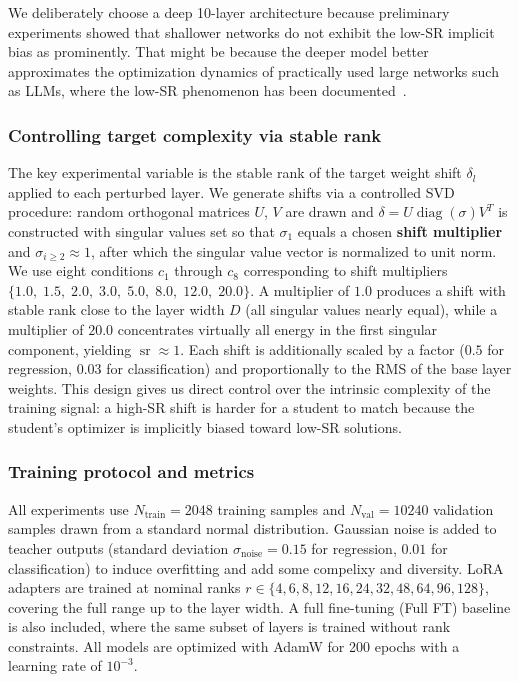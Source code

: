 \documentclass[a4paper,14pt]{extarticle}
\DeclareMathOperator{\sr}{sr}
\begin{document}
    We deliberately choose a deep 10-layer architecture because preliminary experiments showed that shallower networks do not exhibit the low-SR implicit bias as prominently. That might be because the deeper model better approximates the optimization dynamics of practically used large networks such as LLMs, where the low-SR phenomenon has been documented~\cite{lion2025polar}.

    \subsubsection*{Controlling target complexity via stable rank}

    The key experimental variable is the stable rank of the target weight shift $\delta_l$ applied to each perturbed layer. We generate shifts via a controlled SVD procedure: random orthogonal matrices $U$, $V$ are drawn and $\delta = U \operatorname{diag}(\sigma) V^T$ is constructed with singular values set so that $\sigma_1$ equals a chosen \textbf{shift multiplier} and $\sigma_{i \geqslant 2} \approx 1$, after which the singular value vector is normalized to unit norm. We use eight conditions $c_1$ through $c_8$ corresponding to shift multipliers $\{1.0,\;1.5,\;2.0,\;3.0,\;5.0,\;8.0,\;12.0,\;20.0\}$. A multiplier of $1.0$ produces a shift with stable rank close to the layer width $D$ (all singular values nearly equal), while a multiplier of $20.0$ concentrates virtually all energy in the first singular component, yielding $\sr \approx 1$. Each shift is additionally scaled by a factor ($0.5$ for regression, $0.03$ for classification) and proportionally to the RMS of the base layer weights. This design gives us direct control over the intrinsic complexity of the training signal: a high-SR shift is harder for a student to match because the student's optimizer is implicitly biased toward low-SR solutions.

    \subsubsection*{Training protocol and metrics}

    All experiments use $N_{\text{train}} = 2048$ training samples and $N_{\text{val}} = 10240$ validation samples drawn from a standard normal distribution. Gaussian noise is added to teacher outputs (standard deviation $\sigma_{\text{noise}} = 0.15$ for regression, $0.01$ for classification) to induce overfitting and add some compelixy and diversity. LoRA adapters are trained at nominal ranks $r \in \{4, 6, 8, 12, 16, 24, 32, 48, 64, 96, 128\}$, covering the full range up to the layer width. A full fine-tuning (Full FT) baseline is also included, where the same subset of layers is trained without rank constraints. All models are optimized with AdamW for 200 epochs with a learning rate of $10^{-3}$.
\end{document}
